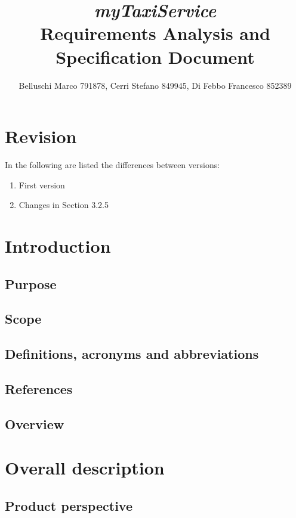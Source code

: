 \documentclass[]{report}
\title{{\Huge\textit{myTaxiService}}\\{\Large Requirements Analysis and Specification Document}}
\author{Belluschi Marco 791878, Cerri Stefano 849945, Di Febbo Francesco 852389}
\begin{document}
\maketitle

\chapter*{Revision}
In the following are listed the differences between versions:
\begin{enumerate}
	\item First version
	\item Changes in Section 3.2.5
\end{enumerate}

\tableofcontents

\chapter{Introduction}

\section{Purpose}


\section{Scope}


\section{Definitions, acronyms and abbreviations}


\section{References}


\section{Overview}


\chapter{Overall description}

\section{Product perspective}

\end{document}
